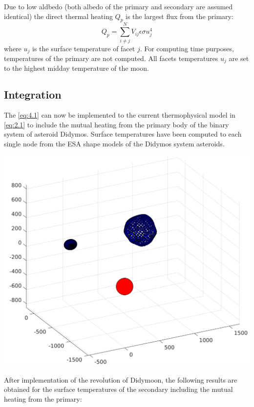 Due to low aldbedo (both albedo of the primary and secondary are assumed identical) the direct thermal heating $Q_p$ is the largest flux from the primary:
\begin{equation}
    Q_p=\sum_{i\neq j}^N V_{ij}\epsilon\sigma u^4_{j}
    \label{eq:4.4}
\end{equation}
where $u_{j}$ is the surface temperature of facet $j$. For computing time purposes, temperatures of the primary are not computed. All facets temperatures $u_{j}$ are set to the highest midday temperature of the moon. 

\subsection{Integration}
The \autoref{eq:4.1} can now be implemented to the current thermophysical model in \autoref{eq:2.1} to include the mutual heating from the primary body of the binary system of asteroid Didymos. Surface temperatures have been computed to each single node from the ESA shape models of the Didymos system asteroids.
\begin{center}
    \includegraphics[width=\linewidth]{rsc/mutual_model.png}
    \label{fig:4.2}
\end{center}
After implementation of the revolution of Didymoon, the following results are obtained for the surface temperatures of the secondary including the mutual heating from the primary:
